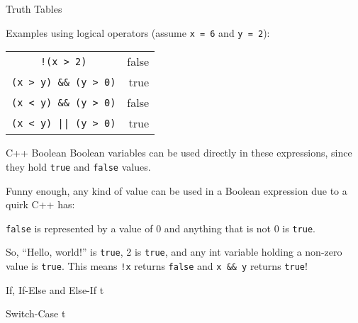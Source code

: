 \documentclass[../lecture3-flowofcontrol.tex]{subfiles}
\begin{document}
\begin{frame}[fragile]{Truth Tables}
    \begin{center}
        Examples using logical operators (assume \verb|x = 6| and \verb|y = 2|):
    \end{center}

    \begin{table}
        \center
        \begin{tabular}{cr}
            \pause \verb|!(x > 2)|           & \pause false \\
            \pause \verb|(x > y) && (y > 0)| & \pause true  \\
            \pause \verb|(x < y) && (y > 0)| & \pause false \\
            \pause \verb+(x < y) || (y > 0)+ & \pause true  \\
        \end{tabular}
    \end{table}
\end{frame}

\begin{frame}[fragile]{C++ Boolean}
    Boolean variables can be used directly in these expressions, since they hold \verb|true| and \verb|false| values. \newline

    Funny enough, any kind of value can be used in a Boolean expression due to a quirk C++ has:
    \begin{center}
        \verb|false| is represented by a value of 0 and anything that is not 0 is \verb|true|. \newline
    \end{center}

    So, “Hello, world!” is \verb|true|, 2 is \verb|true|, and any int variable holding a non-zero value is \verb|true|. This means \verb|!x| returns \verb|false| and \verb|x && y| returns \verb|true|!
\end{frame}


\begin{frame}[fragile]{If, If-Else and Else-If}
t
\end{frame}


\begin{frame}[fragile]{Switch-Case}
t
\end{frame}

\end{document}
